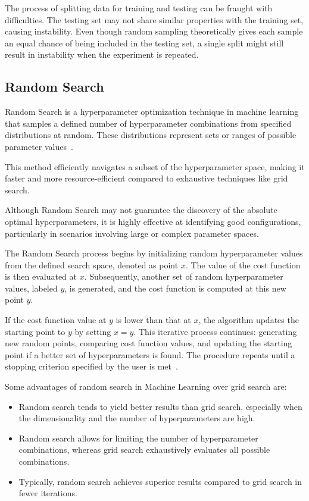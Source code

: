 \documentclass[12pt,a4paper]{report}
\begin{document}
The process of splitting data for training and testing can be fraught with difficulties. The testing set may not share similar properties with the training set, causing instability. Even though random sampling theoretically gives each sample an equal chance of being included in the testing set, a single split might still result in instability when the experiment is repeated.


\subsection{Random Search}
Random Search is a hyperparameter optimization technique in machine learning that samples a defined number of hyperparameter combinations from specified distributions at random. These distributions represent sets or ranges of possible parameter values~\cite{randomsearch}.

This method efficiently navigates a subset of the hyperparameter space, making it faster and more resource-efficient compared to exhaustive techniques like grid search.

Although Random Search may not guarantee the discovery of the absolute optimal hyperparameters, it is highly effective at identifying good configurations, particularly in scenarios involving large or complex parameter spaces.

The Random Search process begins by initializing random hyperparameter values from the defined search space, denoted as point \(x\). The value of the cost function is then evaluated at \(x\). Subsequently, another set of random hyperparameter values, labeled \(y\), is generated, and the cost function is computed at this new point \(y\).

If the cost function value at \(y\) is lower than that at \(x\), the algorithm updates the starting point to \(y\) by setting \(x = y\). This iterative process continues: generating new random points, comparing cost function values, and updating the starting point if a better set of hyperparameters is found. The procedure repeats until a stopping criterion specified by the user is met~\cite{randomsearch2}.

Some advantages of random search in Machine Learning over grid search are:

\begin{itemize}
  \item Random search tends to yield better results than grid search, especially when the dimensionality and the number of hyperparameters are high.
  \item Random search allows for limiting the number of hyperparameter combinations, whereas grid search exhaustively evaluates all possible combinations.
  \item Typically, random search achieves superior results compared to grid search in fewer iterations.
\end{itemize}
\end{document}
